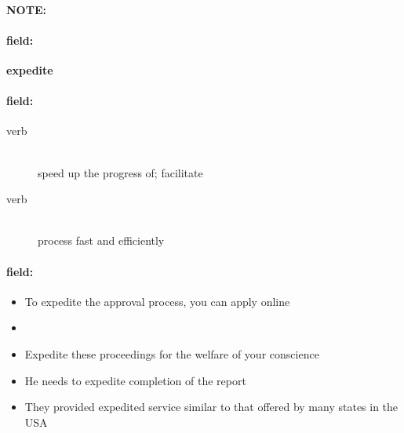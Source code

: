 \documentclass[12pt]{article}
\newenvironment{note}{\paragraph{NOTE:}}{}
\newenvironment{field}{\paragraph{field:}}{}
\begin{document}
\begin{note}
\begin{field}
\textbf{\large expedite}
\end{field}


\begin{field}
\begin{description}
\item[verb] \hfill \\ 
speed up the progress of; facilitate

\item[verb] \hfill \\ 
process fast and efficiently

\end{description}
\end{field}

\begin{field}
\begin{itemize}
\item To expedite the approval process, you can apply online
\item 
\item Expedite these proceedings for the welfare of your conscience
\item He needs to expedite completion of the report
\item They provided expedited service similar to that offered by many states in the USA
\end{itemize}
\end{field}
\end{note}
\end{document}
